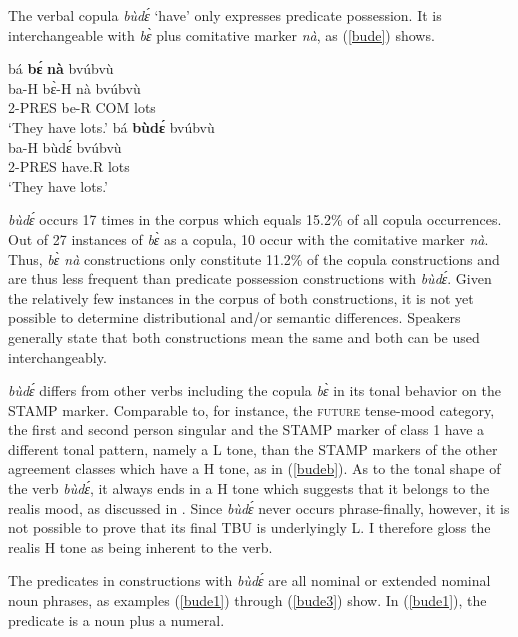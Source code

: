 The verbal copula {\itshape bùdɛ́} `have' only expresses predicate possession. It is interchangeable with {\itshape bɛ̀} plus comitative marker {\itshape nà}, as (\ref{bude}) shows. 

\begin{exe} 
\ex\label{bude}
\begin{xlist} 
\ex\label{budea}
  \glll  bá {\bfseries bɛ́} {\bfseries nà} bvúbvù \\
        ba-H bɛ̀-H nà bvúbvù \\
         2-PRES be-R COM lots   \\
    \trans `They have lots.'
\ex\label{budeb}
  \glll  bá {\bfseries bùdɛ́} bvúbvù \\
        ba-H bùdɛ́ bvúbvù \\
         2-PRES have.R lots   \\
    \trans `They have lots.'
\end{xlist}
\end{exe}

{\itshape bùdɛ́} occurs 17 times in the corpus which equals 15.2\% of all copula occurrences. Out of 27 instances of {\itshape bɛ̀} as a copula, 10 occur with the comitative marker {\itshape nà}. Thus, {\itshape bɛ̀ nà} constructions only constitute 11.2\% of the copula constructions and are thus less frequent than predicate possession constructions with {\itshape bùdɛ́}. Given the relatively few instances in the corpus of both constructions, it is not yet possible to determine distributional and/or semantic differences. Speakers generally state that both constructions mean the same and both can be used interchangeably.

{\itshape bùdɛ́} differs from other verbs including the copula {\itshape bɛ̀} in its tonal behavior on the STAMP marker. Comparable to, for instance, the \textsc{future} tense-mood category, the first and second person singular and the STAMP marker of class 1 have a different tonal pattern, namely a L tone, than the STAMP markers of the other agreement classes which have a H tone, as in (\ref{budeb}). As to the tonal shape of the verb {\itshape bùdɛ́}, it always ends in a H tone which suggests that it belongs to the realis mood, as discussed in . Since {\itshape bùdɛ́} never occurs phrase-finally, however, it is not possible to prove that its final TBU is underlyingly L. I therefore gloss the realis H tone as being inherent to the verb.

The predicates in constructions with {\itshape bùdɛ́} are all nominal or extended nominal noun phrases, as examples (\ref{bude1}) through (\ref{bude3}) show. In (\ref{bude1}), the predicate is a noun plus a numeral.


